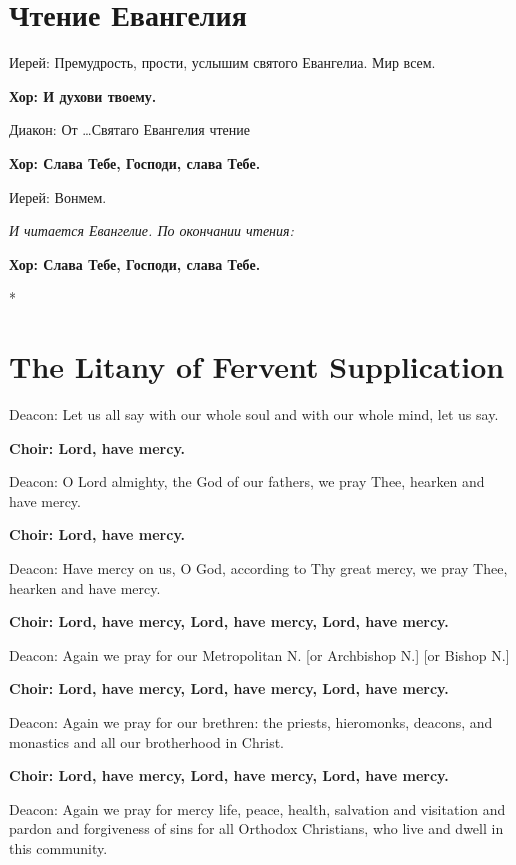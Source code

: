 \documentclass[12pt,a4paper,titlepage]{report}
\begin{document}
\begin{paracol}[1]{2}
	\switchcolumn[1]
	
	\section*{Чтение Евангелия}
	
	Иерей: Премудрость, прости, услышим святого Евангелиа. Мир всем.
	
	\textbf{Хор: И духови твоему.}
	
	Диакон: От \ldots Святаго Евангелия чтение
	
	\textbf{Хор: Слава Тебе, Господи, слава Тебе.}
	
	Иерей: Вонмем.
	
	\indent \textit{И читается Евангелие. По окончании чтения:}
	
	\textbf{Хор: Слава Тебе, Господи, слава Тебе.}
	
	\switchcolumn[0]*
	
	\section*{The Litany of Fervent Supplication}
	
	Deacon: Let us all say with our whole soul and with our whole mind, let us say.
	
	\textbf{Choir: Lord, have mercy.}
	
	Deacon: O Lord almighty, the God of our fathers, we pray Thee, hearken and have mercy.
	
	\textbf{Choir: Lord, have mercy.}
	
	Deacon: Have mercy on us, O God, according to Thy great mercy, we pray Thee, hearken and have mercy.
	
	\textbf{Choir: Lord, have mercy, Lord, have mercy, Lord, have mercy.}
	
	Deacon: Again we pray for our Metropolitan N. [or Archbishop N.] [or Bishop N.]
	
	\textbf{Choir: Lord, have mercy, Lord, have mercy, Lord, have mercy.}
	
	Deacon: Again we pray for our brethren: the priests, hieromonks, deacons, and monastics and all our brotherhood in Christ.
	
	\textbf{Choir: Lord, have mercy, Lord, have mercy, Lord, have mercy.}
	
	Deacon: Again we pray for mercy life, peace, health, salvation and visitation and pardon and forgiveness of sins for all Orthodox Christians, who live and dwell in this community.
	

\end{paracol}
\end{document}
